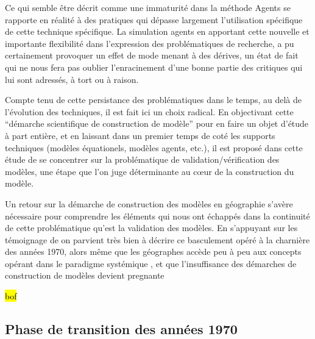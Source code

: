 
Ce qui semble être décrit comme une immaturité dans la méthode Agents \autocite{Heath2009} se rapporte en réalité à des pratiques qui dépasse largement l'utilisation spécifique de cette technique spécifique. La simulation agents en apportant cette nouvelle et importante flexibilité dans l'expression des problématiques de recherche, a pu certainement provoquer un effet de mode menant à des dérives, un état de fait qui ne nous fera pas oublier l'enracinement d'une bonne partie des critiques qui lui sont adressés, à tort ou à raison.

Compte tenu de cette persistance des problématiques dans le temps, au delà de l'évolution des techniques, il est fait ici un choix radical. En objectivant cette \enquote{démarche scientifique de construction de modèle} pour en faire un objet d'étude à part entière, et en laissant dans un premier temps de coté les supports techniques (modèles équationels, modèles agents, etc.), il est proposé dans cette étude de se concentrer sur la problématique de validation/vérification des modèles, une étape que l'on juge déterminante au cœur de la construction du modèle. 

Un retour sur la démarche de construction des modèles en géographie s'avère nécessaire pour comprendre les éléments qui nous ont échappés dans la continuité de cette problématique qu'est la validation des modèles. En s'appuyant sur les témoignage de \autocite{Batty2001, Pumain2003} on parvient très bien à décrire ce basculement opéré à la charnière des années 1970, alors même que les géographes accède peu à peu aux concepts opérant dans le paradigme systémique \autocite{Harvey1969}, et que l'insuffisance des démarches de construction de modèles devient pregnante 

\hl{bof}


\subsection{Phase de transition des années 1970} 

